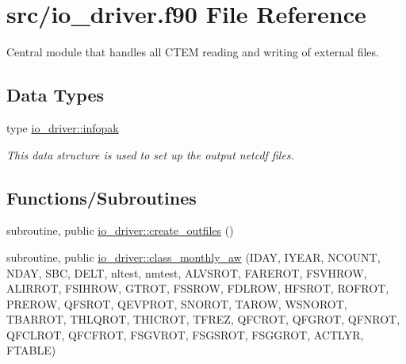 \hypertarget{io__driver_8f90}{}\section{src/io\+\_\+driver.f90 File Reference}
\label{io__driver_8f90}


Central module that handles all C\+T\+E\+M reading and writing of external files.  


\subsection*{Data Types}
\begin{DoxyCompactItemize}
\item 
type \hyperlink{structio__driver_1_1infopak}{io\+\_\+driver\+::infopak}
\begin{DoxyCompactList}\small\item\em This data structure is used to set up the output netcdf files. \end{DoxyCompactList}\end{DoxyCompactItemize}
\subsection*{Functions/\+Subroutines}
{\bf }\par
\begin{DoxyCompactItemize}
\item 
subroutine, public \hyperlink{group__io__driver__create__outfiles_ga8106ac1290e2f83ed1ea0015a8a351f4}{io\+\_\+driver\+::create\+\_\+outfiles} ()
\end{DoxyCompactItemize}

{\bf }\par
\begin{DoxyCompactItemize}
\item 
subroutine, public \hyperlink{group__io__driver__class__monthly__aw_ga58c2e12621635a74096a8f7c142f85de}{io\+\_\+driver\+::class\+\_\+monthly\+\_\+aw} (I\+D\+A\+Y, I\+Y\+E\+A\+R, N\+C\+O\+U\+N\+T, N\+D\+A\+Y, S\+B\+C, D\+E\+L\+T, nltest, nmtest, A\+L\+V\+S\+R\+O\+T, F\+A\+R\+E\+R\+O\+T, F\+S\+V\+H\+R\+O\+W, A\+L\+I\+R\+R\+O\+T, F\+S\+I\+H\+R\+O\+W, G\+T\+R\+O\+T, F\+S\+S\+R\+O\+W, F\+D\+L\+R\+O\+W, H\+F\+S\+R\+O\+T, R\+O\+F\+R\+O\+T, P\+R\+E\+R\+O\+W, Q\+F\+S\+R\+O\+T, Q\+E\+V\+P\+R\+O\+T, S\+N\+O\+R\+O\+T, T\+A\+R\+O\+W, W\+S\+N\+O\+R\+O\+T, T\+B\+A\+R\+R\+O\+T, T\+H\+L\+Q\+R\+O\+T, T\+H\+I\+C\+R\+O\+T, T\+F\+R\+E\+Z, Q\+F\+C\+R\+O\+T, Q\+F\+G\+R\+O\+T, Q\+F\+N\+R\+O\+T, Q\+F\+C\+L\+R\+O\+T, Q\+F\+C\+F\+R\+O\+T, F\+S\+G\+V\+R\+O\+T, F\+S\+G\+S\+R\+O\+T, F\+S\+G\+G\+R\+O\+T, A\+C\+T\+L\+Y\+R, F\+T\+A\+B\+L\+E)
\end{DoxyCompactItemize}

